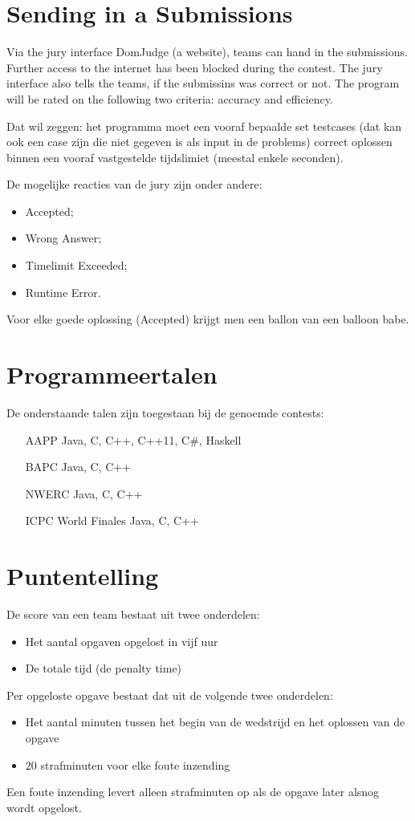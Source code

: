 \section{Sending in a Submissions}
Via the jury interface DomJudge (a website), teams can hand in the submissions. Further access to the internet has been blocked during the contest. The jury interface also tells the teams, if the submissins was correct or not. The program will be rated on the following two criteria: accuracy and efficiency.

Dat wil zeggen: het programma moet een vooraf bepaalde set testcases (dat kan ook een case zijn die niet gegeven is als input in de problems) correct oplossen binnen een vooraf vastgestelde tijdslimiet (meestal enkele seconden).

De mogelijke reacties van de jury zijn onder andere:
\begin{itemize}
\item Accepted;
\item Wrong Answer;
\item Timelimit Exceeded;
\item Runtime Error.
\end{itemize}
Voor elke goede oplossing (Accepted) krijgt men een ballon van een balloon babe.

\section{Programmeertalen}
De onderstaande talen zijn toegestaan bij de genoemde contests:
\begin{itemize}
\item[AAPP] Java, C, C++, C++11, C\#, Haskell
\item[BAPC] Java, C, C++
\item[NWERC] Java, C,  C++
\item[ICPC World Finales] Java, C, C++
\end{itemize}

\section{Puntentelling}
De score van een team bestaat uit twee onderdelen:
\begin{itemize}
\item Het aantal opgaven opgelost in vijf uur
\item De totale tijd (de penalty time)
\end{itemize}
Per opgeloste opgave bestaat dat uit de volgende twee onderdelen:
\begin{itemize}
\item Het aantal minuten tussen het begin van de wedstrijd en het oplossen van de opgave
\item $20$ strafminuten voor elke foute inzending
\end{itemize}
Een foute inzending levert alleen strafminuten op als de opgave later alsnog wordt opgelost.

